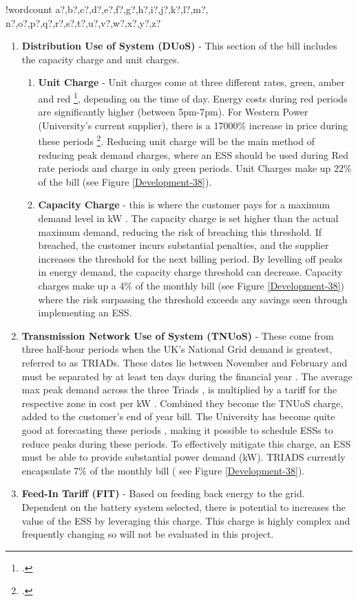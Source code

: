 \documentclass[fontsize=9.5pt]{extarticle}
\numberwithin{figure}{section} %
\newcounter{words}
\newenvironment{counted}{%
  \setcounter{words}{0}
  \SearchList!{wordcount}{\stepcounter{words}}
    {a?,b?,c?,d?,e?,f?,g?,h?,i?,j?,k?,l?,m?,
    n?,o?,p?,q?,r?,s?,t?,u?,v?,w?,x?,y?,z?}
  \UndoBoundary{'}
  \SearchOrder{p;}}{%
  \StopSearching}
\begin{document}
\begin{counted}
\begin{enumerate}
\item \textbf{Distribution Use of System (DUoS)} - This section of the bill includes the capacity charge and unit charges.
\begin{enumerate}
\item \textbf{Unit Charge} - Unit charges come at three different rates, green, amber and red \footcite[See page 27 of][]{SWEB201492:online}, depending on the time of day. Energy costs during red periods are significantly higher (between 5pm-7pm). For Western Power (University's current supplier), there is a 17000\% increase in price during these periods \footcite[25.405 p/kWh in red periods against 0.147p/kWh in green periods][]{SWEB201492:online}. Reducing unit charge will be the main method of reducing peak demand charges, where an ESS should be used during Red rate periods and charge in only green periods. Unit Charges make up 22\% of the bill  (see Figure \ref{Development-38}).
\item \textbf{Capacity Charge} - this is where the customer pays for a maximum demand level in kW \cite{Deconstr52:online}. The capacity charge is set higher than the actual maximum demand, reducing the risk of breaching this threshold. If breached, the customer incurs substantial penalties, and the supplier increases the threshold for the next billing period. By levelling off peaks in energy demand, the capacity charge threshold can decrease. Capacity charges make up a 4\% of the monthly bill  (see Figure \ref{Development-38}) where the risk surpassing the threshold exceeds any savings seen through implementing an ESS.
\end{enumerate}
\item \textbf{Transmission Network Use of System (TNUoS)} - These come from three half-hour periods when the UK's National Grid demand is greatest, referred to as TRIADs. These dates lie between November and February and must be separated by at least ten days during the financial year \cite{TriadsWh7:online}. The average max peak demand across the three Triads \cite{TNUoSTra99:online}, is multiplied by a tariff for the respective zone in cost per kW \cite{TNUoScha93:online}. Combined they become the TNUoS charge, added to the customer's end of year bill. The University has become quite good at forecasting these periods \cite{Jbrentmeet}, making it possible to schedule ESSs to reduce peaks during these periods. To effectively mitigate this charge, an ESS must be able to provide substantial power demand (kW). TRIADS currently encapsulate 7\% of the monthly bill ( see Figure \ref{Development-38}).
\item \textbf{Feed-In Tariff (FIT)} - Based on feeding back energy to the grid. Dependent on the battery system selected, there is potential to increases the value of the ESS by leveraging this charge. This charge is highly complex and frequently changing so will not be evaluated in this project.
\end{enumerate}


\end{counted}
\end{document}
